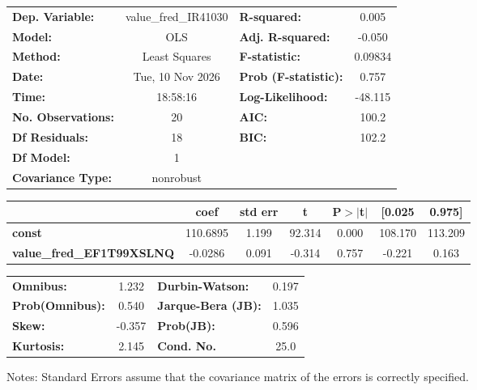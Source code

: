 \begin{center}
\begin{tabular}{lclc}
\toprule
\textbf{Dep. Variable:}           & value\_fred\_IR41030 & \textbf{  R-squared:         } &     0.005   \\
\textbf{Model:}                   &         OLS          & \textbf{  Adj. R-squared:    } &    -0.050   \\
\textbf{Method:}                  &    Least Squares     & \textbf{  F-statistic:       } &   0.09834   \\
\textbf{Date:}                    &   Tue, 10 Nov 2026   & \textbf{  Prob (F-statistic):} &    0.757    \\
\textbf{Time:}                    &       18:58:16       & \textbf{  Log-Likelihood:    } &   -48.115   \\
\textbf{No. Observations:}        &            20        & \textbf{  AIC:               } &     100.2   \\
\textbf{Df Residuals:}            &            18        & \textbf{  BIC:               } &     102.2   \\
\textbf{Df Model:}                &             1        & \textbf{                     } &             \\
\textbf{Covariance Type:}         &      nonrobust       & \textbf{                     } &             \\
\bottomrule
\end{tabular}
\begin{tabular}{lcccccc}
                                  & \textbf{coef} & \textbf{std err} & \textbf{t} & \textbf{P$> |$t$|$} & \textbf{[0.025} & \textbf{0.975]}  \\
\midrule
\textbf{const}                    &     110.6895  &        1.199     &    92.314  &         0.000        &      108.170    &      113.209     \\
\textbf{value\_fred\_EF1T99XSLNQ} &      -0.0286  &        0.091     &    -0.314  &         0.757        &       -0.221    &        0.163     \\
\bottomrule
\end{tabular}
\begin{tabular}{lclc}
\textbf{Omnibus:}       &  1.232 & \textbf{  Durbin-Watson:     } &    0.197  \\
\textbf{Prob(Omnibus):} &  0.540 & \textbf{  Jarque-Bera (JB):  } &    1.035  \\
\textbf{Skew:}          & -0.357 & \textbf{  Prob(JB):          } &    0.596  \\
\textbf{Kurtosis:}      &  2.145 & \textbf{  Cond. No.          } &     25.0  \\
\bottomrule
\end{tabular}
\end{center}

Notes: \newline
 [1] Standard Errors assume that the covariance matrix of the errors is correctly specified.